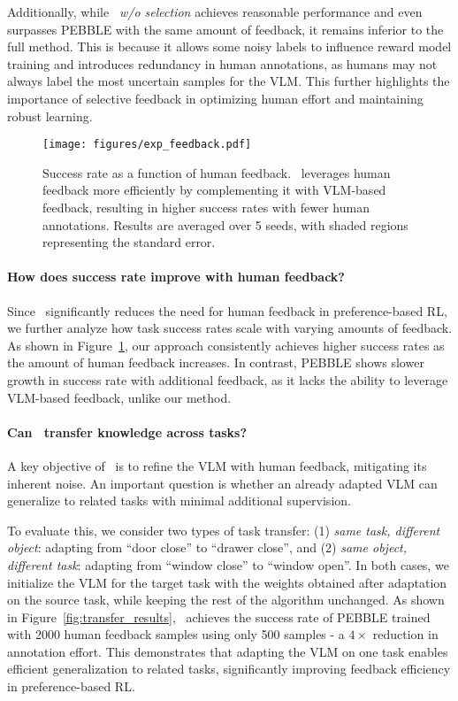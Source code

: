 Additionally, while \textit{\algo~w/o selection} achieves reasonable performance and even surpasses PEBBLE with the same amount of feedback, it remains inferior to the full method. This is because it allows some noisy labels to influence reward model training and introduces redundancy in human annotations, as humans may not always label the most uncertain samples for the VLM. This further highlights the importance of selective feedback in optimizing human effort and maintaining robust learning.

\begin{figure}[t]
    \centering
    \texttt{[image: figures/exp\_feedback.pdf]}
    \caption{Success rate as a function of human feedback. \algo~leverages human feedback more efficiently by complementing it with VLM-based feedback, resulting in higher success rates with fewer human annotations. Results are averaged over 5 seeds, with shaded regions representing the standard error.}
    \label{fig:human_feedback}
\end{figure}

\paragraph{How does success rate improve with human feedback?} 
Since \algo~significantly reduces the need for human feedback in preference-based RL, we further analyze how task success rates scale with varying amounts of feedback. As shown in Figure~\ref{fig:human_feedback}, our approach consistently achieves higher success rates as the amount of human feedback increases. In contrast, PEBBLE shows slower growth in success rate with additional feedback, as it lacks the ability to leverage VLM-based feedback, unlike our method.

\paragraph{Can \algo~transfer knowledge across tasks?}
A key objective of \algo~is to refine the VLM with human feedback, mitigating its inherent noise. An important question is whether an already adapted VLM can generalize to related tasks with minimal additional supervision.

To evaluate this, we consider two types of task transfer: (1) \emph{same task, different object}: adapting from ``door close'' to ``drawer close'', and (2) \emph{same object, different task}: adapting from ``window close'' to ``window open''. In both cases, we initialize the VLM for the target task with the weights obtained after adaptation on the source task, while keeping the rest of the algorithm unchanged. As shown in Figure~\ref{fig:transfer_results}, \algo~achieves the success rate of PEBBLE trained with 2000 human feedback samples using only 500 samples - a $4\times$ reduction in annotation effort. This demonstrates that adapting the VLM on one task enables efficient generalization to related tasks, significantly improving feedback efficiency in preference-based RL.

